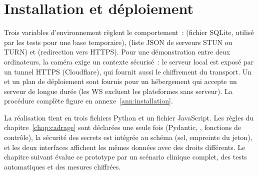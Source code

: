 \section{Installation et déploiement}

Trois variables d'environnement règlent le comportement~:  (fichier SQLite, utilisé par les tests pour une base temporaire),  (liste \ac{JSON} de serveurs \ac{STUN} ou \ac{TURN}) et  (redirection vers HTTPS). Pour une démonstration entre deux ordinateurs, la caméra exige un contexte sécurisé~: le serveur local est exposé par un tunnel \ac{HTTPS} (Cloudflare), qui fournit aussi le chiffrement du transport. Un  et un plan de déploiement sont fournis pour un hébergement qui accepte un serveur de longue durée (les \ac{WS} excluent les plateformes sans serveur). La procédure complète figure en annexe~\ref{ann:installation}.

\conclchap

La réalisation tient en trois fichiers Python et un fichier JavaScript. Les règles du chapitre~\ref{chap:cadrage} sont déclarées une seule fois (Pydantic, , fonctions de contrôle), la sécurité des secrets est intégrée au schéma (sel, empreinte du jeton), et les deux interfaces affichent les mêmes données avec des droits différents. Le chapitre suivant évalue ce prototype par un scénario clinique complet, des tests automatiques et des mesures chiffrées.
